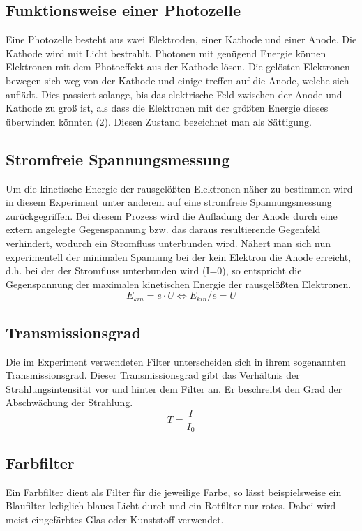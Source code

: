 \documentclass{scrartcl}
\begin{document}
	\subsection{Funktionsweise einer Photozelle}
	Eine Photozelle besteht aus zwei Elektroden, einer Kathode und einer Anode. Die Kathode wird mit Licht bestrahlt.
	 Photonen mit genügend Energie können Elektronen mit dem Photoeffekt aus der Kathode lösen.
	  Die gelösten Elektronen bewegen sich weg von der Kathode und einige treffen auf die Anode, welche sich
	   auflädt. Dies passiert solange, bis das elektrische Feld zwischen der Anode und Kathode zu groß ist,
		als dass die Elektronen mit der größten Energie dieses überwinden könnten (2).
		 Diesen Zustand bezeichnet man als Sättigung.
	\subsection{Stromfreie Spannungsmessung}
		Um die kinetische Energie der rausgelößten Elektronen näher zu bestimmen wird in diesem Experiment unter anderem
		auf eine stromfreie Spannungsmessung zurückgegriffen. Bei diesem Prozess wird die Aufladung der Anode durch eine 
		extern angelegte Gegenspannung bzw. das daraus resultierende Gegenfeld verhindert, wodurch ein Stromfluss unterbunden wird.
		Nähert man sich nun experimentell der minimalen Spannung bei der kein Elektron die Anode erreicht, d.h. bei der 
		der Stromfluss unterbunden wird (I=0), so entspricht die Gegenspannung der maximalen kinetischen Energie der 
		rausgelößten Elektronen.
		\begin{equation}
			E_{kin} = e \cdot U \Leftrightarrow E_{kin}/e = U
		\end{equation}
	\subsection{Transmissionsgrad}
		Die im Experiment verwendeten Filter unterscheiden sich in ihrem sogenannten Transmissionsgrad. Dieser Transmissionsgrad
		gibt das Verhältnis der Strahlungsintensität vor und hinter dem Filter an. Er beschreibt den Grad der Abschwächung der Strahlung.
		\begin{equation}
			T = \frac{I}{I_0}
		\end{equation}
	\subsection{Farbfilter}
		Ein Farbfilter dient als Filter für die jeweilige Farbe, so lässt beispielsweise ein Blaufilter lediglich 
		blaues Licht durch und ein Rotfilter nur rotes. Dabei wird meist eingefärbtes Glas oder Kunststoff verwendet.
\end{document}
